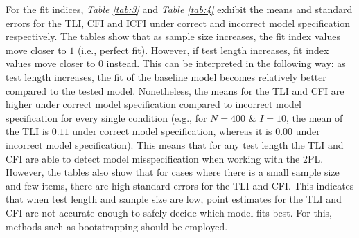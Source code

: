 \documentclass[Royal,sageapa,times,doublespace]{sagej}
\begin{document}
\indent For the fit indices, \textit{Table \ref{tab:3}} and \textit{Table \ref{tab:4}} exhibit the means and standard errors for the TLI, CFI and ICFI under correct and incorrect model specification respectively. The tables show that as sample size increases, the fit index values move closer to $1$ (i.e., perfect fit). However, if test length increases, fit index values move closer to $0$ instead. This can be interpreted in the following way: as test length increases, the fit of the baseline model becomes relatively better compared to the tested model. Nonetheless, the means for the TLI and CFI are higher under correct model specification compared to incorrect model specification for every single condition (e.g., for $N = 400$ \& $I = 10$, the mean of the TLI is $0.11$ under correct model specification, whereas it is $0.00$ under incorrect model specification). This means that for any test length the TLI and CFI are able to detect model misspecification when working with the 2PL. However, the tables also show that for cases where there is a small sample size and few items, there are high standard errors for the TLI and CFI. This indicates that when test length and sample size are low, point estimates for the TLI and CFI are not accurate enough to safely decide which model fits best. For this, methods such as bootstrapping should be employed. \\
\end{document}
